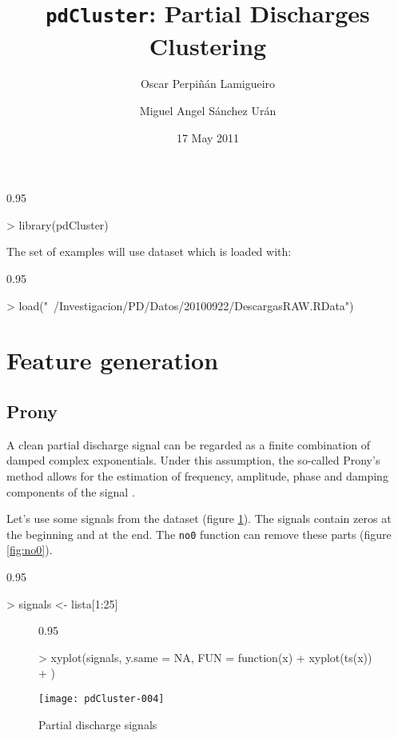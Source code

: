 \documentclass{article}
\renewenvironment{Schunk}{\begin{center}
    \scriptsize
    \begin{boxedminipage}{0.95\textwidth}}{
    \end{boxedminipage}\end{center}}
\begin{document}

\title{\texttt{pdCluster}: Partial Discharges Clustering} 


\author{Oscar Perpiñán Lamigueiro \and Miguel Angel Sánchez Urán}


\date{17 May 2011}

\maketitle

\begin{Schunk}
\begin{Sinput}
> library(pdCluster)
\end{Sinput}
\end{Schunk}

The set of examples will use dataset which is loaded with:
\begin{Schunk}
\begin{Sinput}
> load("~/Investigacion/PD/Datos/20100922/DescargasRAW.RData")
\end{Sinput}
\end{Schunk}
\section{Feature generation}

\subsection{Prony}
\label{sec:prony}
A clean partial discharge signal can be regarded as a finite combination of
damped complex exponentials. Under this assumption, the so-called
Prony's method allows for the estimation of frequency, amplitude,
phase and damping components of the signal
\cite{Kumaresan.Tufts1982,Hauer.Demeure.ea1990,Kumaresan.Tufts.ea1984}.

Let's use some signals from the dataset (figure
\ref{fig:pd_signal}). The signals contain zeros at the beginning and
at the end. The \texttt{no0} function can remove these parts (figure \ref{fig:no0}).
\begin{Schunk}
\begin{Sinput}
> signals <- lista[1:25]
\end{Sinput}
\end{Schunk}

\begin{figure}
  \centering
\begin{Schunk}
\begin{Sinput}
> xyplot(signals, y.same = NA, FUN = function(x) {
+     xyplot(ts(x))
+ })
\end{Sinput}
\end{Schunk}
\texttt{[image: pdCluster-004]}
  \caption{Partial discharge signals}
  \label{fig:pd_signal}
\end{figure}
\end{document}

